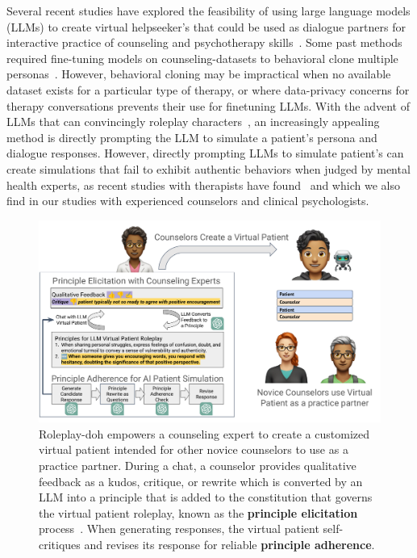 Several recent studies have explored the feasibility of using large language models (LLMs) to create virtual helpseeker's that could be used as dialogue partners for interactive practice of counseling and psychotherapy skills~\citep{tanana2019development, demasi-etal-2020-multi, chen2023llmempowered}. Some past methods required fine-tuning models on counseling-datasets to behavioral clone multiple personas~\cite{demasi-etal-2020-multi}. However, behavioral cloning   may be impractical when no available dataset exists for a particular type of therapy, or where data-privacy concerns for therapy conversations prevents their use for finetuning LLMs. With the advent of LLMs that can convincingly roleplay characters~\cite{park2022social, park2023generative}, an increasingly appealing method is directly prompting the LLM to simulate a patient's persona and dialogue responses. However, directly prompting LLMs to simulate patient's can create simulations that fail to exhibit authentic behaviors  when judged by mental health experts, as recent studies with therapists have found~\cite{chen2023llmempowered} and which we also find in our studies with experienced counselors and clinical psychologists. 

\begin{figure}[t]
    \centering
    \includegraphics[width=\textwidth]{figures/rpdteaser.pdf}
    \caption{Roleplay-doh empowers a counseling expert to create a customized virtual patient intended for other novice counselors to use as a practice partner. During a chat, a counselor provides qualitative feedback as a kudos, critique, or rewrite which is converted by an LLM into a principle that is added to the constitution that governs the virtual patient roleplay, known as the \textbf{principle elicitation} process~\cite{petridis2023constitutionmaker}. When generating responses, the virtual patient self-critiques and revises its response for reliable \textbf{principle adherence}.}
    \label{fig:rpdteaser}
\end{figure}


